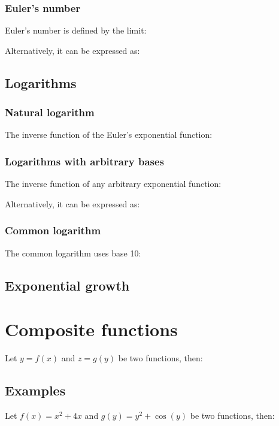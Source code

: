 \documentclass{article}
\begin{document}
\subsubsection{Euler's number}
Euler's number is defined by the limit:

Alternatively, it can be expressed as:

\subsection{Logarithms}
\subsubsection{Natural logarithm}
The inverse function of the Euler's exponential function:


\subsubsection{Logarithms with arbitrary bases}
The inverse function of any arbitrary exponential function:

Alternatively, it can be expressed as:

\subsubsection{Common logarithm}
The common logarithm uses base 10:

\newpage
\subsection{Exponential growth}

\section{Composite functions}
Let $y=f(x)$ and $z=g(y)$ be two functions, then:


\subsection{Examples}
Let $f(x)=x^2+4x$ and $g(y)=y^2+\cos(y)$ be two functions, then:
\end{document}
